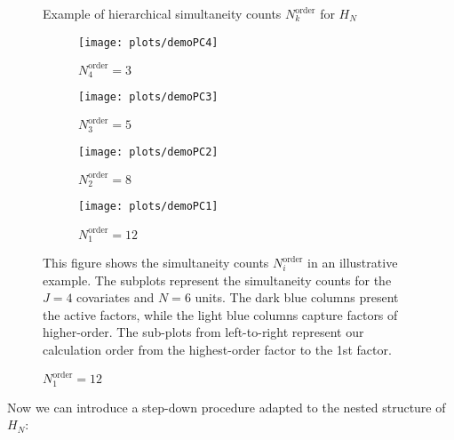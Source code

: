\documentclass[11pt]{article}
\newcommand\tcaptab[1]{\captionsetup{position=top, font=normalsize, labelfont=bf, textfont=normalfont, justification=centering, margin=0mm, aboveskip=1mm, belowskip=0mm, labelsep=colon, singlelinecheck=false}\caption{#1}}
\newcommand\bnotetab[1]{\captionsetup{position=bottom, font=footnotesize,  textfont=normalfont, margin=1mm, skip=2mm, justification=justified, singlelinecheck=false}\caption*{#1}}
\begin{document}
	
	\begin{figure}[t!]
		\centering
		\tcaptab{Example of hierarchical simultaneity counts ${N}_k^{\text{order}}$ for $H_{N}$} \label{fig:demo2}
		\begin{center}
			\begin{subfigure}[t]{.24\textwidth}
				\texttt{[image: plots/demoPC4]}
				\caption{$N_4^{\text{order}}=3$}
			\end{subfigure}
			\begin{subfigure}[t]{.24\textwidth}
				\texttt{[image: plots/demoPC3]}
				\caption{$N_3^{\text{order}}=5$}
			\end{subfigure}
			\begin{subfigure}[t]{.24\textwidth}
				\texttt{[image: plots/demoPC2]}
				\caption{$N_2^{\text{order}}=8$}
			\end{subfigure}
			\begin{subfigure}[t]{.24\textwidth}
				\texttt{[image: plots/demoPC1]}
				\caption{$N_1^{\text{order}}=12$}
			\end{subfigure}
		\end{center}
		\bnotetab{This figure shows the simultaneity counts $N_i^{\text{order}}$ in an illustrative example. The subplots represent the simultaneity counts for the $J=4$ covariates and $N=6$ units. The dark blue columns present the active factors, while the light blue columns capture factors of higher-order. The sub-plots from left-to-right represent our calculation order from the highest-order factor to the 1st factor.}
	\end{figure}
	
	
	
	
	Now we can introduce a step-down procedure adapted to the nested structure of $H_{N}$:
	
\end{document}
